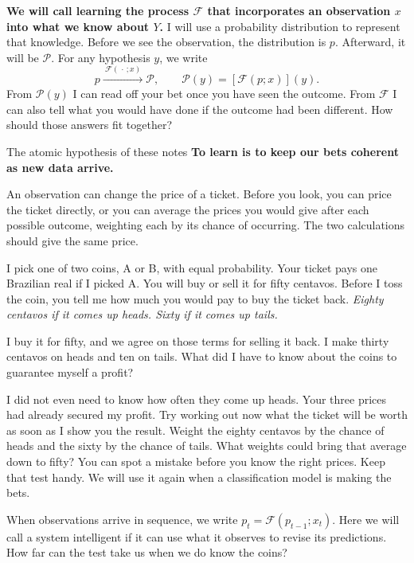\documentclass[12pt,oneside]{article}
\newcommand{\bookanchor}[1]{\phantomsection\label{#1}}
\begin{document}
\textbf{We\bookanchor{topic-01-1} will call learning the process \(\mathcal F\) that incorporates an observation \(x\) into what we know about \(Y\).} I will use a probability distribution to represent that knowledge. Before we see the observation, the distribution is \(p\). Afterward, it will be \(\mathcal P\). For any hypothesis \(y\), we write
\[
 p \xrightarrow{\ \mathcal F(\,\cdot\,;x)\ } \mathcal P,
 \qquad \mathcal P(y)=[\mathcal F(p;x)](y).
\]
From $\mathcal P(y)$ I can read off your bet once you have seen the outcome. From $\mathcal F$ I can also tell what you would have done if the outcome had been different. How should those answers fit together?

\begin{quadro}{The atomic hypothesis of these notes}
\textbf{To\bookanchor{topic-01-2} learn is to keep our bets coherent as new data arrive.}

An observation can change the price of a ticket. Before you look, you can price the ticket directly, or you can average the prices you would give after each possible outcome, weighting each by its chance of occurring. The two calculations should give the same price.
\end{quadro}

I pick one of two coins, A or B, with equal probability. Your ticket pays one Brazilian real if I picked A. You will buy or sell it for fifty centavos. Before I toss the coin, you tell me how much you would pay to buy the ticket back. \emph{Eighty centavos if it comes up heads. Sixty if it comes up tails.}

I buy it for fifty, and we agree on those terms for selling it back. I make thirty centavos on heads and ten on tails. What did I have to know about the coins to guarantee myself a profit?

I did not even need to know how often they come up heads. Your three prices had already secured my profit. Try working out now what the ticket will be worth as soon as I show you the result. Weight the eighty centavos by the chance of heads and the sixty by the chance of tails. What weights could bring that average down to fifty? You can spot a mistake before you know the right prices. Keep that test handy. We will use it again when a classification model is making the bets.

When observations arrive in sequence, we write $p_t=\mathcal F(p_{t-1};x_t)$. Here we will call a system intelligent if it can use what it observes to revise its predictions. How far can the test take us when we do know the coins?
\end{document}

